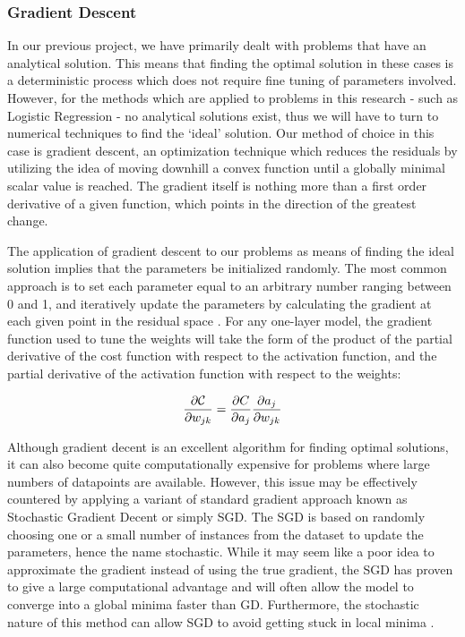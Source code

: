 \documentclass[onecolumn,10pt,cleanfoot]{asme2ej}
\begin{document}
\subsubsection{Gradient Descent}

In our previous project, we have primarily dealt with problems that have an analytical solution. This means that finding the optimal solution in these cases is a deterministic process which does not require fine tuning of parameters involved. However, for the methods which are applied to problems in this research - such as Logistic Regression - no analytical solutions exist, thus we will have to turn to numerical techniques to find the ‘ideal’ solution. Our method of choice in this case is gradient descent, an optimization technique which reduces the residuals by utilizing the idea of moving downhill a convex function until a globally minimal scalar value is reached. The gradient itself is nothing more than a first order derivative of a given function, which points in the direction of the greatest change. 

The application of gradient descent to our problems as means of finding the ideal solution implies that the parameters be initialized randomly. The most common approach is to set each parameter equal to an arbitrary number ranging between 0 and 1, and iteratively update the parameters by calculating the gradient at each given point in the residual space \cite[preface p. x]{dds}.  For any one-layer model, the gradient function used to tune the weights will take the form of the product of the partial derivative of the cost function with respect to the activation function, and the partial derivative of the activation function with respect to the weights: 

\begin{equation}
\frac{\partial{\cal C}}{\partial w_{jk}}  = \frac{\partial C}{\partial a_{j}}\frac{\partial a_j}{\partial w_{jk}}
\end{equation}

Although gradient decent is an excellent algorithm for finding optimal solutions, it can also become quite computationally expensive for problems where large numbers of datapoints are available. However, this issue may be effectively countered by applying a variant of standard gradient approach known as Stochastic Gradient Decent or simply SGD. The SGD is based on randomly choosing one or a small number of instances from the dataset to update the parameters, hence the name stochastic. While it may seem like a poor idea to approximate the gradient instead of using the true gradient, the SGD has proven to give a large computational advantage and will often allow the model to converge into a global minima faster than GD. Furthermore, the stochastic nature of this method can allow SGD to avoid getting stuck in local minima \cite[46]{sr}.
\end{document}
